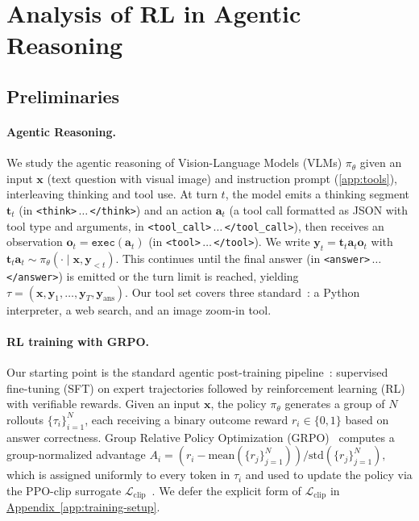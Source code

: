 \documentclass{llmxive}
\providecommand{\bm}[1]{\boldsymbol{#1}}
\providecommand{\appref}[1]{\hyperref[#1]{Appendix~\ref*{#1}}}
\providecommand{\think}{\texttt{<think>}\xspace}
\providecommand{\thinkr}{\texttt{</think>}\xspace}
\providecommand{\toolcall}{\texttt{<tool\_call>}\xspace}
\providecommand{\toolcallr}{\texttt{</tool\_call>}\xspace}
\providecommand{\tool}{\texttt{<tool>}\xspace}
\providecommand{\toolr}{\texttt{</tool>}\xspace}
\providecommand{\answer}{\texttt{<answer>}\xspace}
\providecommand{\answerr}{\texttt{</answer>}\xspace}
\providecommand{\va}{{\bm{a}}}
\providecommand{\vo}{{\bm{o}}}
\providecommand{\vt}{{\bm{t}}}
\providecommand{\vx}{{\bm{x}}}
\providecommand{\vy}{{\bm{y}}}
\begin{document}
\section{Analysis of RL in Agentic Reasoning}
\subsection{Preliminaries}

\paragraph{Agentic Reasoning.}
We study the agentic reasoning of Vision-Language Models (VLMs) $\pi_\theta$ given an input $\vx$ (text question with visual image) and instruction prompt (\ref{app:tools}), interleaving thinking and tool use. At turn $t$, the model emits a thinking segment $\vt_t$ (in \think$\,\ldots\,$\thinkr) and an action $\va_t$ (a tool call formatted as JSON with tool type and arguments, in \toolcall$\,\ldots\,$\toolcallr), then receives an observation $\vo_t = \texttt{exec}(\va_t)$ (in \tool$\,\ldots\,$\toolr). 
We write $\vy_t = \vt_t \va_t \vo_t$ with $\vt_t \va_t \sim \pi_\theta(\cdot \mid \vx, \vy_{<t})$. This continues until the final answer (in \answer$\,\ldots\,$\answerr) is emitted or the turn limit is reached, yielding $\tau = (\vx, \vy_1, \ldots, \vy_T, \vy_{\text{ans}})$. Our tool set covers three standard~\citep{mini-o3, pyvision-rl, deepeyesv2}: a Python interpreter, a web search, and an image zoom-in tool.

\paragraph{RL training with GRPO.}
\label{sec:prelim-rl}

Our starting point is the standard agentic post-training pipeline~\citep{pyvision-rl, deepeyesv2}: supervised fine-tuning (SFT) on expert trajectories followed by reinforcement learning (RL) with verifiable rewards. Given an input $\vx$, the policy $\pi_\theta$ generates a group of $N$ rollouts $\{\tau_i\}_{i=1}^N$, each receiving a binary outcome reward $r_i \in \{0, 1\}$ based on answer correctness. Group Relative Policy Optimization (GRPO)~\citep{GRPO} computes a group-normalized advantage $A_i = (r_i - \mathrm{mean}(\{r_j\}_{j=1}^N)) / \mathrm{std}(\{r_j\}_{j=1}^N),$
which is assigned uniformly to every token in $\tau_i$ and used to update the policy via the PPO-clip surrogate $\mathcal{L}_{\text{clip}}$~\citep{PPO}. We defer the explicit form of $\mathcal{L}_{\text{clip}}$ in \appref{app:training-setup}.
\end{document}
